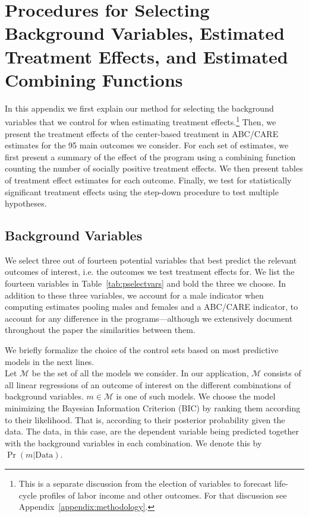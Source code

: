 \section{Procedures for Selecting Background Variables, Estimated Treatment Effects, and Estimated Combining Functions} \label{appendix:results}

\noindent In this appendix we first explain our method for selecting the background variables that we control for when estimating treatment effects.\footnote{This is a separate discussion from the election of variables to forecast life-cycle profiles of labor income and other outcomes. For that discussion see Appendix~\ref{appendix:methodology}.} Then, we present the treatment effects of the center-based treatment in ABC/CARE estimates for the 95 main outcomes we consider. For each set of estimates, we first present a summary of the effect of the program using a combining function counting the number of socially positive treatment effects. We then present tables of treatment effect estimates for each outcome. Finally, we test for statistically significant treatment effects using the step-down procedure to test multiple hypotheses.\\

\subsection{Background Variables} \label{appendix:bvariables}

\noindent We select three out of fourteen potential variables that best predict the relevant outcomes of interest, i.e. the outcomes we test treatment effects for. We list the fourteen variables in Table~\ref{tab:pselectvars} and bold the three we choose. In addition to these three variables, we account for a male indicator when computing estimates pooling males and females and a ABC/CARE indicator, to account for any difference in the programs---although we extensively document throughout the paper the similarities between them. 

\singlespacing

\doublespacing

\noindent We briefly formalize the choice of the control sets based on most predictive models in the next lines.\\

\noindent Let $\mathcal{M}$ be the set of all the models we consider. In our application, $\mathcal{M}$ consists of all linear regressions of an outcome of interest on the different combinations of background variables. $m \in \mathcal{M}$ is one of such models. We choose the model minimizing the Bayesian Information Criterion (BIC) by ranking them according to their likelihood. That is, according to their posterior probability given the data. The data, in this case, are the dependent variable being predicted together with the background variables in each combination. We denote this by $\Pr( m | \text{Data} )$.\\

